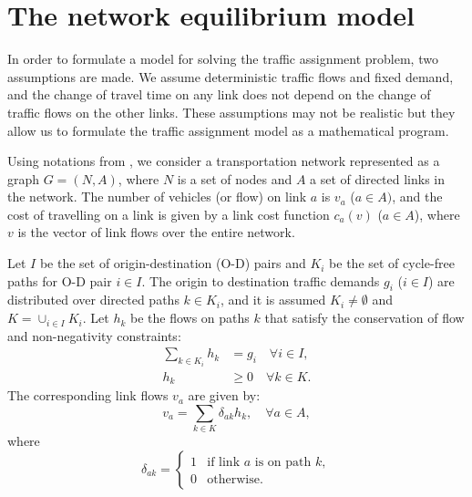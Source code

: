 \section{The network equilibrium model}
In order to formulate a model for solving the traffic assignment problem,
two assumptions are made.
We assume deterministic traffic flows and fixed demand,
and the change of travel time on any link does not depend on the change of traffic flows on the other links.
These assumptions may not be realistic  but they allow us to formulate the traffic assignment model as a mathematical program.

Using notations from \citet{Florian, Florian2008},
we consider a transportation network represented as a graph $G = (N, A)$,
where $N$ is a set of nodes and $A$ a set of directed links in the network.
The number of vehicles (or flow) on link $a$ is $v_a$ ($a \in A)$,
and the cost of travelling on a link is given by a link cost function $c_a(v)$ ($a \in A$),
where $v$ is the vector of link flows over the entire network.

Let $I$ be the set of origin-destination (O-D) pairs
and $K_i$ be the set of cycle-free paths for O-D pair $i \in I$.
The origin to destination traffic demands $g_i$ ($i \in I$) are distributed over directed paths $k \in K_i$,
and it is assumed $K_i \neq \emptyset$ and $K = \cup_{i \in I} K_i$.
Let $h_k$ be the flows on paths $k$ that satisfy the conservation of flow and non-negativity constraints:
\begin{align} \label{model_1}
    \sum_{k \in K_i} h_k & = g_i \quad \forall i \in I,  \\
    h_k &\geq 0 \quad \forall k \in K.
\end{align}
The corresponding link flows $v_a$ are given by:
\begin{equation}
    v_a = \sum_{k \in K} \delta_{ak} h_k, \quad \forall a \in A,
\end{equation}
where
\begin{equation} \label{model_4}
    \delta_{ak} = 
    \begin{cases}
        1 & \text{if link $a$ is on path $k$},\\
        0 & \text{otherwise}.
    \end{cases}
\end{equation}

